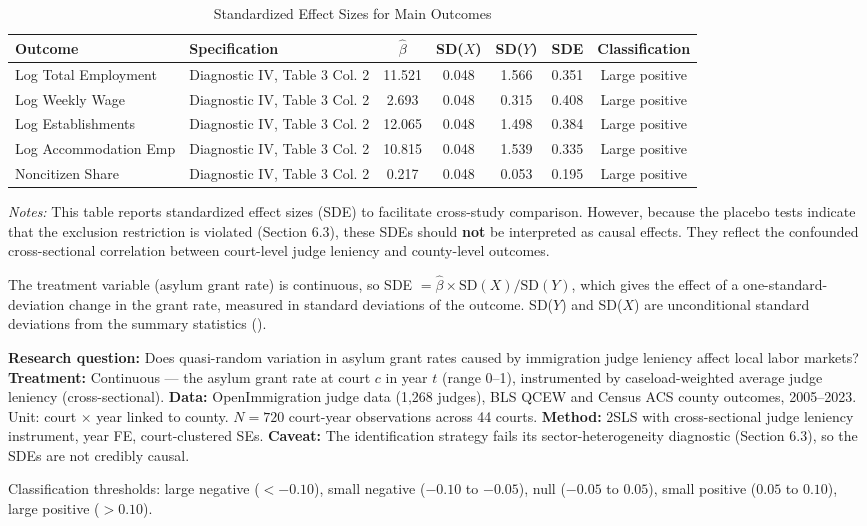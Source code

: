 \documentclass[12pt]{article}
\begin{document}
\begin{table}[H]
\centering
\caption{Standardized Effect Sizes for Main Outcomes}
\label{tab:sde}
\begin{adjustbox}{max width=\textwidth}
\begin{tabular}{llccccc}
\toprule
Outcome & Specification & $\hat{\beta}$ & SD($X$) & SD($Y$) & SDE & Classification \\
\midrule
Log Total Employment & Diagnostic IV, Table 3 Col. 2 & 11.521 & 0.048 & 1.566 & 0.351 & Large positive \\
Log Weekly Wage & Diagnostic IV, Table 3 Col. 2 & 2.693 & 0.048 & 0.315 & 0.408 & Large positive \\
Log Establishments & Diagnostic IV, Table 3 Col. 2 & 12.065 & 0.048 & 1.498 & 0.384 & Large positive \\
Log Accommodation Emp & Diagnostic IV, Table 3 Col. 2 & 10.815 & 0.048 & 1.539 & 0.335 & Large positive \\
Noncitizen Share & Diagnostic IV, Table 3 Col. 2 & 0.217 & 0.048 & 0.053 & 0.195 & Large positive \\
\bottomrule
\end{tabular}
\end{adjustbox}
\par\vspace{0.3em}
{\footnotesize \emph{Notes:} This table reports standardized effect sizes (SDE)
to facilitate cross-study comparison. However, because the placebo tests indicate
that the exclusion restriction is violated (Section 6.3), these SDEs should
\textbf{not} be interpreted as causal effects. They reflect the confounded
cross-sectional correlation between court-level judge leniency and county-level
outcomes.

The treatment variable (asylum grant rate) is continuous, so
SDE $= \hat{\beta} \times \text{SD}(X) / \text{SD}(Y)$,
which gives the effect of a one-standard-deviation change in the grant rate,
measured in standard deviations of the outcome.
SD($Y$) and SD($X$) are unconditional standard deviations from the summary
statistics ().

\textbf{Research question:} Does quasi-random variation in asylum grant rates caused by immigration judge leniency affect local labor markets?
\textbf{Treatment:} Continuous --- the asylum grant rate at court $c$ in year $t$ (range 0--1), instrumented by caseload-weighted average judge leniency (cross-sectional).
\textbf{Data:} OpenImmigration judge data (1,268 judges), BLS QCEW and Census ACS county outcomes, 2005--2023. Unit: court $\times$ year linked to county. $N = 720$ court-year observations across 44 courts.
\textbf{Method:} 2SLS with cross-sectional judge leniency instrument, year FE, court-clustered SEs.
\textbf{Caveat:} The identification strategy fails its sector-heterogeneity diagnostic (Section 6.3), so the SDEs are not credibly causal.

Classification thresholds:
large negative ($< -0.10$), small negative ($-0.10$ to $-0.05$),
null ($-0.05$ to $0.05$), small positive ($0.05$ to $0.10$),
large positive ($> 0.10$).}
\end{table}
\end{document}
